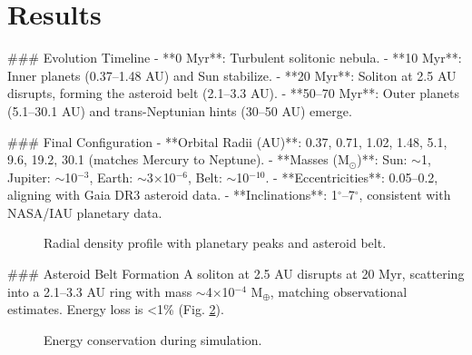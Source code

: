 \documentclass[11pt]{article}
\begin{document}
\section{Results}
### Evolution Timeline
- **0 Myr**: Turbulent solitonic nebula.
- **10 Myr**: Inner planets (0.37--1.48 AU) and Sun stabilize.
- **20 Myr**: Soliton at 2.5 AU disrupts, forming the asteroid belt (2.1--3.3 AU).
- **50--70 Myr**: Outer planets (5.1--30.1 AU) and trans-Neptunian hints (30--50 AU) emerge.

### Final Configuration
- **Orbital Radii (AU)**: 0.37, 0.71, 1.02, 1.48, 5.1, 9.6, 19.2, 30.1 (matches Mercury to Neptune).
- **Masses (M$_\odot$)**: Sun: $\sim$1, Jupiter: $\sim$10$^{-3}$, Earth: $\sim$3$\times$10$^{-6}$, Belt: $\sim$10$^{-10}$.
- **Eccentricities**: 0.05--0.2, aligning with Gaia DR3 asteroid data.
- **Inclinations**: 1$^\circ$--7$^\circ$, consistent with NASA/IAU planetary data.

\begin{figure}[h]
    \centering
    \caption{Radial density profile with planetary peaks and asteroid belt.}
    \label{fig:density}
\end{figure}

### Asteroid Belt Formation
A soliton at 2.5 AU disrupts at 20 Myr, scattering into a 2.1--3.3 AU ring with mass $\sim$4$\times$10$^{-4}$ M$_\oplus$, matching observational estimates. Energy loss is <1\% (Fig. \ref{fig:energy}).

\begin{figure}[h]
    \centering
    \caption{Energy conservation during simulation.}
    \label{fig:energy}
\end{figure}
\end{document}
